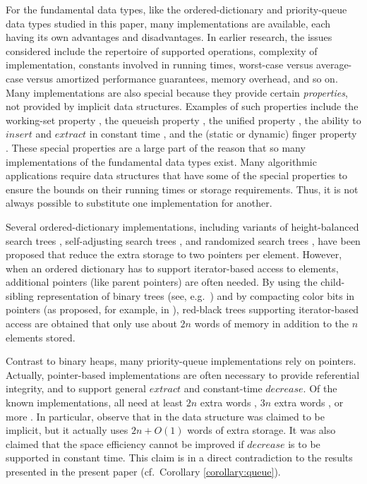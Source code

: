 \documentclass{DIKU-article}
\newcommand{\Insert}{\mbox{$\mathit{insert}$}}
\newcommand{\Extract}{\mbox{$\mathit{extract}$}}
\newcommand{\Decrease}{\mbox{$\mathit{decrease}$}}
\begin{document}
For the fundamental data types, like the ordered-dictionary and
priority-queue data types studied in this paper, many implementations
are available, each having its own advantages and disadvantages.  In
earlier research, the issues considered include the repertoire of
supported operations, complexity of implementation, constants involved
in running times, worst-case versus average-case versus amortized
performance guarantees, memory overhead, and so on.  Many
implementations are also special because they provide certain
\emph{properties}, not provided by implicit data structures.  Examples
of such properties include the working-set property \cite{i01,st85b},
the queueish property \cite{il02}, the unified property
\cite{i01,st85b}, the ability to \Insert{} and \Extract{} in constant
time \cite{Fle96,hm82,LO88}, and the (static or dynamic) finger
property \cite{as96,bt80,c95,gmpr77,hm82}.  These special properties
are a large part of the reason that so many implementations of the
fundamental data types exist.  Many algorithmic applications require
data structures that have some of the special properties to ensure the
bounds on their running times or storage requirements.  Thus, it is
not always possible to substitute one implementation for another.

Several ordered-dictionary implementations, including variants of
height-balanced search trees \cite{Bro79}, self-adjusting search trees
\cite{And99,gr93,st85b}, and randomized search trees \cite{as96,p90},
have been proposed that reduce the extra storage to two pointers per
element. However, when an ordered dictionary has to support
iterator-based access to elements, additional pointers (like parent
pointers) are often needed. By using the child-sibling representation
of binary trees (see, e.g.~\cite[Section 4.1]{Tar83}) and by
compacting color bits in pointers (as proposed, for example, in
\cite{BK06}), red-black trees supporting iterator-based access are
obtained that only use about $2n$ words of memory in addition to the
$n$ elements stored.

Contrast to binary heaps, many priority-queue implementations rely on
pointers. Actually, pointer-based implementations are often necessary
to provide referential integrity, and to support general \Extract{} and
constant-time \Decrease{}. Of the known implementations, all need at
least $2n$ extra words \cite{DW93,MP05}, $3n$ extra words
\cite{EJK05}, or more \cite{DGST88,KST02}. In particular, observe that
in \cite{MP05} the data structure was claimed to be implicit, but it
actually uses $2n + O(1)$ words of extra storage. It was also claimed
that the space efficiency cannot be improved if \Decrease{} is to be
supported in constant time. This claim is in a direct contradiction to
the results presented in the present paper (cf.~Corollary
\ref{corollary:queue}).
\end{document}
